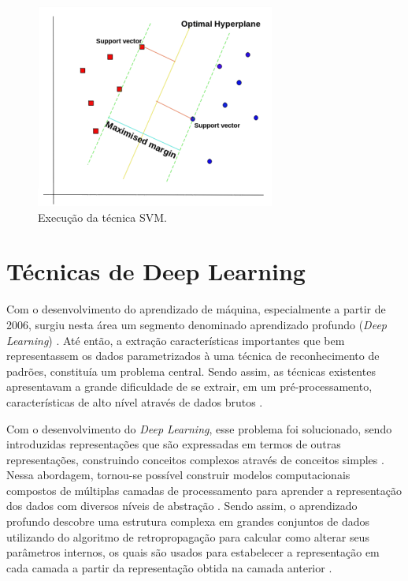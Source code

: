 \begin{figure}[h]
  \centering
  \caption{Execução da técnica SVM.}
   \label{fig:execucao_svm}
   \includegraphics[width=0.7\textwidth]{figuras/fig_7.png}
\end{figure}

\section{Técnicas de Deep Learning}

Com o desenvolvimento do aprendizado de máquina, especialmente a partir de 2006, surgiu nesta área um segmento denominado aprendizado profundo (\textit{Deep Learning}) \cite{Deng2014}. Até então, a extração características importantes que bem representassem os dados parametrizados à uma técnica de reconhecimento de padrões, constituía um problema central. Sendo assim, as técnicas existentes apresentavam a grande dificuldade de se extrair, em um pré-processamento, características de alto nível através de dados brutos \cite{Goodfellow2016}. 

Com o desenvolvimento do \textit{Deep Learning}, esse problema foi solucionado, sendo introduzidas representações que são expressadas em termos de outras representações, construindo conceitos complexos através de conceitos simples \cite{Goodfellow2016}. Nessa abordagem, tornou-se possível construir modelos computacionais compostos de múltiplas camadas de processamento para aprender a representação dos dados com diversos níveis de abstração \cite{LeCun2015}. Sendo assim, o aprendizado profundo descobre uma estrutura complexa em grandes conjuntos de dados utilizando do algoritmo de retropropagação para calcular como alterar seus parâmetros internos, os quais são usados para estabelecer a representação em cada camada a partir da representação obtida na camada anterior \cite{LeCun2015}.

